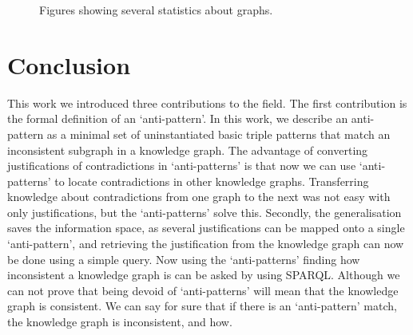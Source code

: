 \documentclass[11pt,letterpaper ,oneside ]{book}
\begin{document}
\begin{figure}[!t]
	\caption{Figures showing several statistics about graphs.}
	\label{fig:GraphStats}
\end{figure}


\newpage


\chapter{Conclusion}\label{Conclusion}
This work we introduced three contributions to the field. 
The first contribution is the formal definition of an `anti-pattern'. In this work, we describe an anti-pattern as a minimal set of uninstantiated basic triple patterns that match an inconsistent subgraph in a knowledge graph. The advantage of converting justifications of contradictions in `anti-patterns' is that now we can use `anti-patterns' to locate contradictions in other knowledge graphs. Transferring knowledge about contradictions from one graph to the next was not easy with only justifications, but the `anti-patterns' solve this. 
Secondly, the generalisation saves the information space, as several justifications can be mapped onto a single `anti-pattern', and retrieving the justification from the knowledge graph can now be done using a simple query. Now using the `anti-patterns' finding how inconsistent a knowledge graph is can be asked by using SPARQL. Although we can not prove that being devoid of `anti-patterns' will mean that the knowledge graph is consistent. We can say for sure that if there is an `anti-pattern' match, the knowledge graph is inconsistent, and how.  \\
\end{document}
